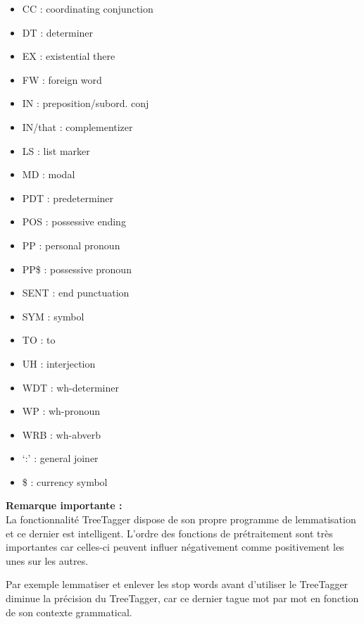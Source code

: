 \documentclass[a4paper]{report}
\begin{document}
                \begin{itemize}
                    \item CC : coordinating conjunction
                    \item DT : determiner
                    \item EX : existential there
                    \item FW : foreign word
                    \item IN : preposition/subord. conj
                    \item IN/that : complementizer
                    \item LS : list marker
                    \item MD : modal
                    \item PDT :	predeterminer
                    \item POS :	possessive ending
                    \item PP : personal pronoun
                    \item PP\$ : possessive pronoun
                    \item SENT : end punctuation
                    \item SYM : symbol
                    \item TO : to
                    \item UH : interjection
                    \item WDT : wh-determiner
                    \item WP : wh-pronoun
                    \item WRB : wh-abverb
                    \item ‘:’ : general joiner
                    \item \$ : currency symbol\\
                \end{itemize}

                \textbf{Remarque importante :}\\
                La fonctionnalité TreeTagger dispose de son propre programme de lemmatisation et ce dernier est intelligent. L’ordre des fonctions de prétraitement sont très importantes car celles-ci peuvent influer négativement comme positivement les unes sur les autres.

                Par exemple lemmatiser et enlever les stop words avant d’utiliser le TreeTagger diminue la précision du TreeTagger, car ce dernier tague mot par mot en fonction de son contexte grammatical.
\end{document}
